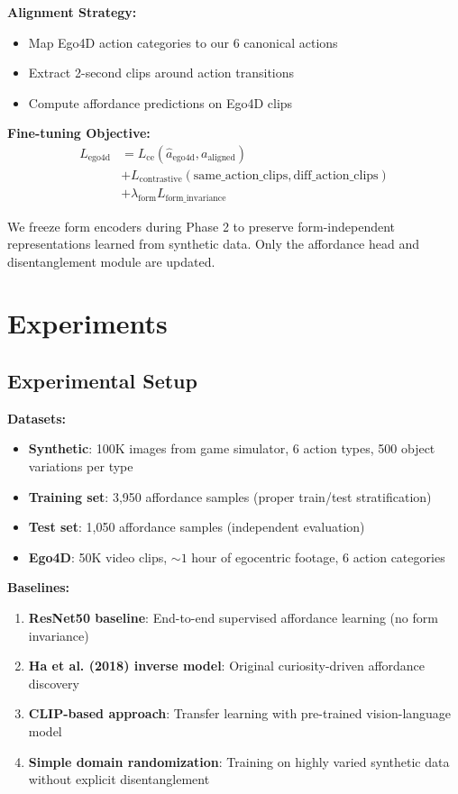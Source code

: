 \documentclass[11pt]{article}
\begin{document}
\textbf{Alignment Strategy:}
\begin{itemize}
    \item Map Ego4D action categories to our 6 canonical actions
    \item Extract 2-second clips around action transitions
    \item Compute affordance predictions on Ego4D clips
\end{itemize}

\textbf{Fine-tuning Objective:}
\begin{equation}
\begin{split}
L_{\text{ego4d}} &= L_{\text{ce}}(\hat{a}_{\text{ego4d}}, a_{\text{aligned}}) \\
&+ L_{\text{contrastive}}(\text{same\_action\_clips}, \text{diff\_action\_clips}) \\
&+ \lambda_{\text{form}} L_{\text{form\_invariance}}
\end{split}
\end{equation}

We freeze form encoders during Phase 2 to preserve form-independent representations learned from synthetic data. Only the affordance head and disentanglement module are updated.

\section{Experiments}

\subsection{Experimental Setup}

\textbf{Datasets:}
\begin{itemize}
    \item \textbf{Synthetic}: 100K images from game simulator, 6 action types, 500 object variations per type
    \item \textbf{Training set}: 3,950 affordance samples (proper train/test stratification)
    \item \textbf{Test set}: 1,050 affordance samples (independent evaluation)
    \item \textbf{Ego4D}: 50K video clips, $\sim 1$ hour of egocentric footage, 6 action categories
\end{itemize}

\textbf{Baselines:}
\begin{enumerate}
    \item \textbf{ResNet50 baseline}: End-to-end supervised affordance learning (no form invariance)
    \item \textbf{Ha et al. (2018) inverse model}: Original curiosity-driven affordance discovery
    \item \textbf{CLIP-based approach}: Transfer learning with pre-trained vision-language model
    \item \textbf{Simple domain randomization}: Training on highly varied synthetic data without explicit disentanglement
\end{enumerate}
\end{document}

